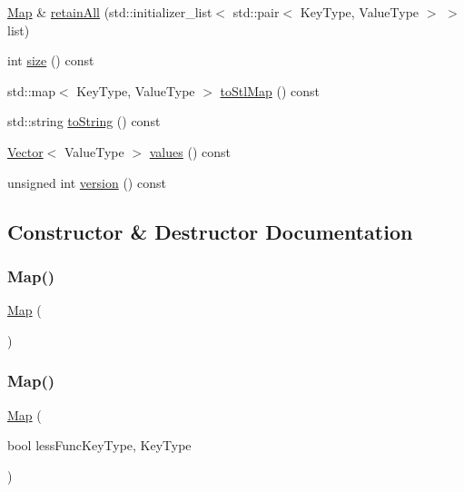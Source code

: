 \begin{DoxyCompactItemize}
\item 
\mbox{\hyperlink{classMap}{Map}} \& \mbox{\hyperlink{classMap_a16d237e15768c6f5f3b7a9f633a6551d}{retain\+All}} (std\+::initializer\+\_\+list$<$ std\+::pair$<$ Key\+Type, Value\+Type $>$ $>$ list)
\item 
int \mbox{\hyperlink{classMap_af9593d4a5ff4274efaf429cb4f9e57cc}{size}} () const
\item 
std\+::map$<$ Key\+Type, Value\+Type $>$ \mbox{\hyperlink{classMap_a23355a5d94a45080e9ec0cf50059fb97}{to\+Stl\+Map}} () const
\item 
std\+::string \mbox{\hyperlink{classMap_a1fe5121d6528fdea3f243321b3fa3a49}{to\+String}} () const
\item 
\mbox{\hyperlink{classVector}{Vector}}$<$ Value\+Type $>$ \mbox{\hyperlink{classMap_a50ccbe4184324f0da975648a12728d20}{values}} () const
\item 
unsigned int \mbox{\hyperlink{classMap_a0aa696ccb72cbf928535d6b646bac1aa}{version}} () const
\end{DoxyCompactItemize}


\subsection{Constructor \& Destructor Documentation}
\mbox{\label{classMap_a49848ab3a0e1934c5615242b67af68c7}} 
\subsubsection{\texorpdfstring{Map()}{Map()}\hspace{0.1cm}{\footnotesize\ttfamily [1/8]}}
{\footnotesize\ttfamily \mbox{\hyperlink{classMap}{Map}} (\begin{DoxyParamCaption}{ }\end{DoxyParamCaption})}

\mbox{\label{classMap_ad1ada5d0cc94f69c235f999c2fbc3dff}} 
\subsubsection{\texorpdfstring{Map()}{Map()}\hspace{0.1cm}{\footnotesize\ttfamily [2/8]}}
{\footnotesize\ttfamily \mbox{\hyperlink{classMap}{Map}} (\begin{DoxyParamCaption}\item[{bool }]{less\+FuncKey\+Type, Key\+Type }\end{DoxyParamCaption})}

